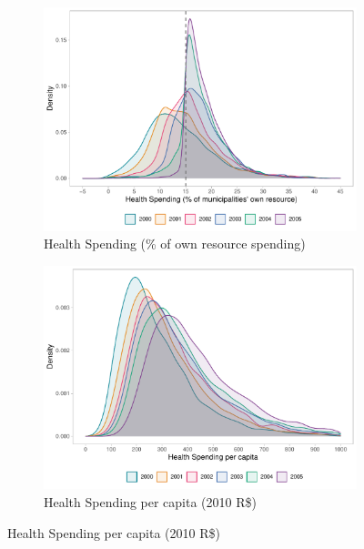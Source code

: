\begin{figure}[h]
    \begin{center}
    \caption{\footnotesize Spending Density Plots}\label{fig:density}
    \begin{subfigure}{0.48\textwidth}
        \caption{\scriptsize Health Spending (\% of own resource spending)}\label{fig:density_a}
        \centering
        \includegraphics[width=\textwidth]{plots/hist_ec29.pdf}
    \end{subfigure}
        \begin{subfigure}{0.48\textwidth}
        \caption{\scriptsize Health Spending per capita (2010 R\$)}\label{fig:density_b}
        \centering
        \includegraphics[width=\textwidth]{plots/hist_pc.pdf}
    \end{subfigure}
    \end{center}\vspace{+1pt}
\end{figure}


